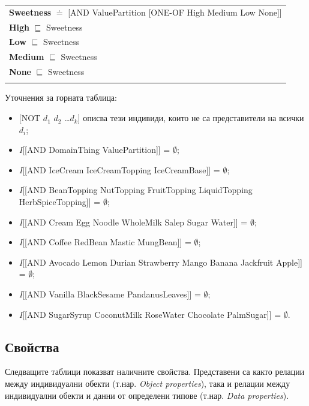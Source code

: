 \documentclass[12pt]{article}
\begin{document}
\begin{tabularx}{1\textwidth}{@{}X@{}}
            \textbf{Sweetness} $\doteq$ [AND ValuePartition [ONE-OF High Medium Low None]] \\            
            \textbf{High} $\sqsubseteq$ Sweetness \\
            \textbf{Low} $\sqsubseteq$ Sweetness \\
            \textbf{Medium} $\sqsubseteq$ Sweetness \\
            \textbf{None} $\sqsubseteq$ Sweetness \\
            \tabularnewline

        \bottomrule
        \end{tabularx}


    Уточнения за горната таблица:

        \begin{itemize} 
            \item{} [NOT $d_1$ $d_2$ \ldots $d_k$] описва тези индивиди, които не са представители на всички $d_i$;
            \item{} \textit{I}[[AND DomainThing ValuePartition]] = $\emptyset$;
            \item{} \textit{I}[[AND IceCream IceCreamTopping IceCreamBase]] = $\emptyset$;
            \item{} \textit{I}[[AND BeanTopping NutTopping FruitTopping LiquidTopping HerbSpiceTopping]] = $\emptyset$;
            \item{} \textit{I}[[AND Cream Egg Noodle WholeMilk Salep Sugar Water]] = $\emptyset$;
            \item{} \textit{I}[[AND Coffee RedBean Mastic MungBean]] = $\emptyset$;
            \item{} \textit{I}[[AND Avocado Lemon Durian Strawberry Mango Banana Jackfruit Apple]] = $\emptyset$;
            \item{} \textit{I}[[AND Vanilla BlackSesame PandanusLeaves]] = $\emptyset$;
            \item{} \textit{I}[[AND SugarSyrup CoconutMilk RoseWater Chocolate PalmSugar]] = $\emptyset$.
        \end{itemize}
    
    \subsection{Свойства}

    Следващите таблици показват наличните свойства. Представени са както релации между индивидуални обекти (т.нар. \textit{Object properties}), така и релации между индивидуални обекти и данни от определени типове (т.нар. \textit{Data properties}).
    
\end{document}
